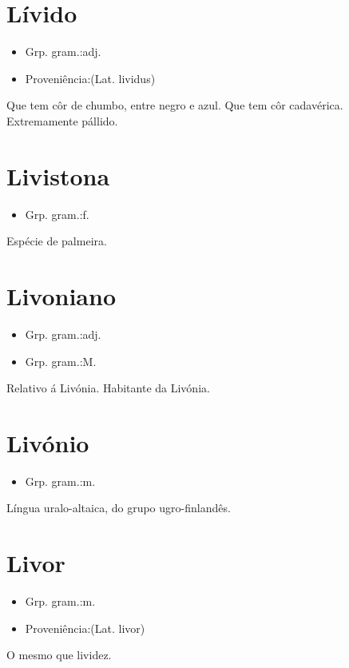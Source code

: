 \section{Lívido}
\begin{itemize}
\item {Grp. gram.:adj.}
\end{itemize}
\begin{itemize}
\item {Proveniência:(Lat. \textunderscore lividus\textunderscore )}
\end{itemize}
Que tem côr de chumbo, entre negro e azul.
Que tem côr cadavérica.
Extremamente pállido.
\section{Livistona}
\begin{itemize}
\item {Grp. gram.:f.}
\end{itemize}
Espécie de palmeira.
\section{Livoniano}
\begin{itemize}
\item {Grp. gram.:adj.}
\end{itemize}
\begin{itemize}
\item {Grp. gram.:M.}
\end{itemize}
Relativo á Livónia.
Habitante da Livónia.
\section{Livónio}
\begin{itemize}
\item {Grp. gram.:m.}
\end{itemize}
Língua uralo-altaica, do grupo ugro-finlandês.
\section{Livor}
\begin{itemize}
\item {Grp. gram.:m.}
\end{itemize}
\begin{itemize}
\item {Proveniência:(Lat. \textunderscore livor\textunderscore )}
\end{itemize}
O mesmo que \textunderscore lividez\textunderscore .
